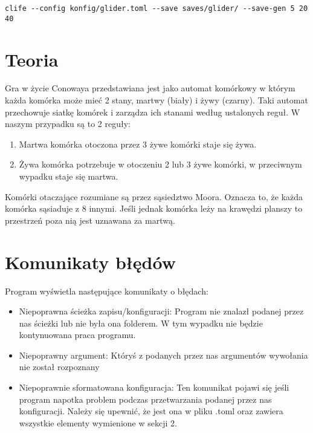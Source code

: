 \documentclass[12pt]{article}
\begin{document}
\begin{verbatim}
clife --config konfig/glider.toml --save saves/glider/ --save-gen 5 20 40
\end{verbatim}

\section{Teoria}

Gra w życie Conowaya przedstawiana jest jako automat komórkowy w którym każda komórka może mieć 2 stany,
martwy (biały) i żywy (czarny).
Taki automat przechowuje siatkę komórek i zarządza ich stanami według ustalonych reguł.
W naszym przypadku są to 2 reguły:
\begin{enumerate}
\item
Martwa komórka otoczona przez 3 żywe komórki staje się żywa.
\item
Żywa komórka potrzebuje w otoczeniu 2 lub 3 żywe komórki, w przeciwnym wypadku staje się martwa.
\end{enumerate}
Komórki otaczające rozumiane są przez sąsiedztwo Moora.
Oznacza to, że każda komórka sąsiaduje z 8 innymi.
Jeśli jednak komórka leży na krawędzi planszy to przestrzeń poza nią jest uznawana za martwą.

\section{Komunikaty błędów}

Program wyświetla następujące komunikaty o błędach:
\begin{itemize}
\item
Niepoprawna ścieżka zapisu/konfiguracji:
Program nie znalazł podanej przez nas ścieżki lub nie była ona folderem.
W tym wypadku nie będzie kontynuowana praca programu.

\item
Niepoprawny argument:
Któryś z podanych przez nas argumentów wywołania nie został rozpoznany

\item
Niepoprawnie sformatowana konfiguracja:
Ten komunikat pojawi się jeśli program napotka problem podczas przetwarzania podanej przez nas konfiguracji.
Należy się upewnić, że jest ona w pliku .toml oraz zawiera wszystkie elementy wymienione w sekcji 2.

\end{itemize}
\end{document}
